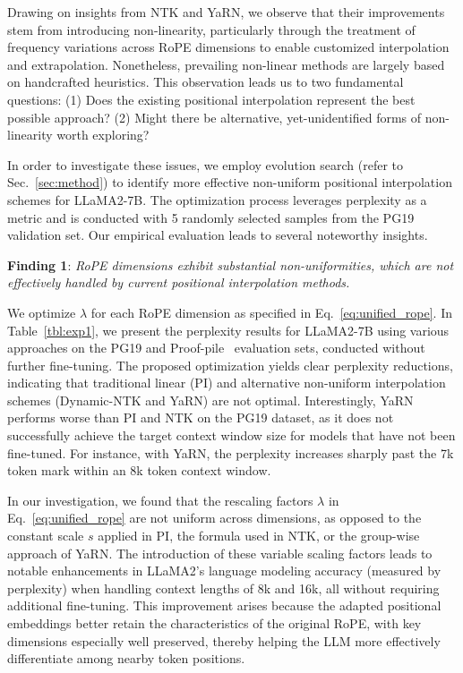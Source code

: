 Drawing on insights from NTK and YaRN, we observe that their improvements stem from introducing non-linearity, particularly through the treatment of frequency variations across RoPE dimensions to enable customized interpolation and extrapolation. Nonetheless, prevailing non-linear methods are largely based on handcrafted heuristics. This observation leads us to two fundamental questions: (1) Does the existing positional interpolation represent the best possible approach? (2) Might there be alternative, yet-unidentified forms of non-linearity worth exploring?

In order to investigate these issues, we employ evolution search (refer to Sec.~\ref{sec:method}) to identify more effective non-uniform positional interpolation schemes for LLaMA2-7B. The optimization process leverages perplexity as a metric and is conducted with 5 randomly selected samples from the PG19~\cite{pg19} validation set. Our empirical evaluation leads to several noteworthy insights.

\textbf{Finding 1}: \textit{RoPE dimensions exhibit substantial non-uniformities, which are not effectively handled by current positional interpolation methods.}

We optimize $\lambda$ for each RoPE dimension as specified in Eq.~\ref{eq:unified_rope}. In Table~\ref{tbl:exp1}, we present the perplexity results for LLaMA2-7B using various approaches on the PG19 and Proof-pile~\cite{proof-pile} evaluation sets, conducted without further fine-tuning. The proposed optimization yields clear perplexity reductions, indicating that traditional linear (PI) and alternative non-uniform interpolation schemes (Dynamic-NTK and YaRN) are not optimal. Interestingly, YaRN performs worse than PI and NTK on the PG19 dataset, as it does not successfully achieve the target context window size for models that have not been fine-tuned. For instance, with YaRN, the perplexity increases sharply past the 7k token mark within an 8k token context window.

In our investigation, we found that the rescaling factors $\lambda$ in Eq.~\ref{eq:unified_rope} are not uniform across dimensions, as opposed to the constant scale $s$ applied in PI, the formula used in NTK, or the group-wise approach of YaRN. The introduction of these variable scaling factors leads to notable enhancements in LLaMA2's language modeling accuracy (measured by perplexity) when handling context lengths of 8k and 16k, all without requiring additional fine-tuning. This improvement arises because the adapted positional embeddings better retain the characteristics of the original RoPE, with key dimensions especially well preserved, thereby helping the LLM more effectively differentiate among nearby token positions.

